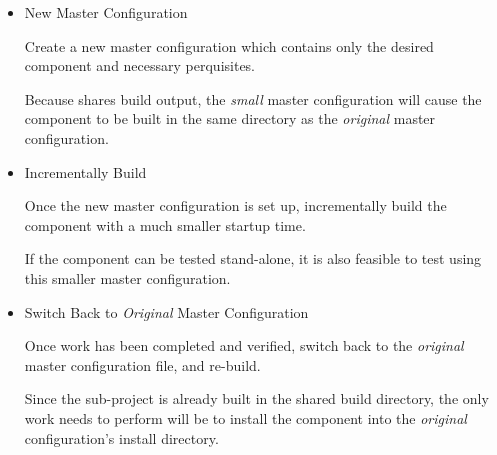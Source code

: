 \begin{itemize}
\item New Master Configuration

  Create a new master configuration which contains only the desired
  component and necessary perquisites.

  Because \lmsbw shares build output, the \emph{small} master
  configuration will cause the component to be built in the same
  directory as the \emph{original} master configuration.

\item Incrementally Build

  Once the new master configuration is set up, incrementally build the
  component with a much smaller startup time.

  If the component can be tested stand-alone, it is also feasible to
  test using this smaller master configuration.

\item Switch Back to \emph{Original} Master Configuration

  Once work has been completed and verified, switch back to the
  \emph{original} master configuration file, and re-build.

  Since the sub-project is already built in the shared build
  directory, the only work \lmsbw needs to perform will be to install
  the component into the \emph{original} configuration's install
  directory.
\end{itemize}

